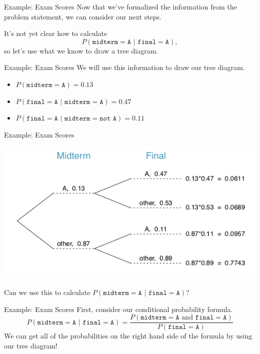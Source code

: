 \begin{frame}{Example: Exam Scores}
    Now that we've formalized the information from the problem statement, we can consider our next steps.
    
    \vspace{12pt}It's not yet clear how to calculate 
    \[P(\texttt{midterm}=\texttt{A }|\texttt{ final}=\texttt{A}),\]
    so let's use what we know to draw a tree diagram.
\end{frame}

\begin{frame}{Example: Exam Scores}
    We will use this information to draw our tree diagram.
    \begin{itemize}
        \item $P(\texttt{midterm}=\texttt{A})=0.13$
        \item $P(\texttt{final}=\texttt{A } | \texttt{ midterm}=\texttt{A})=0.47$
        \item $P(\texttt{final}=\texttt{A } | \texttt{ midterm}=\texttt{not A})=0.11$
    \end{itemize}
\end{frame}

\begin{frame}{Example: Exam Scores}
    \begin{center}
        \includegraphics[scale=0.5]{images/tree2.png}
    \end{center}
    Can we use this to calculate $P(\texttt{midterm}=\texttt{A }|\texttt{ final}=\texttt{A})$?
\end{frame}

\begin{frame}{Example: Exam Scores}
    First, consider our conditional probability formula.
    \[
        P(\texttt{midterm}=\texttt{A }|\texttt{ final}=\texttt{A}) = \frac{P(\texttt{midterm}=\texttt{A }\text{and}\texttt{ final}=\texttt{A})}{P(\texttt{final}=\texttt{A})}
    \]
    We can get all of the probabilities on the right hand side of the formula by using our tree diagram!
\end{frame}

